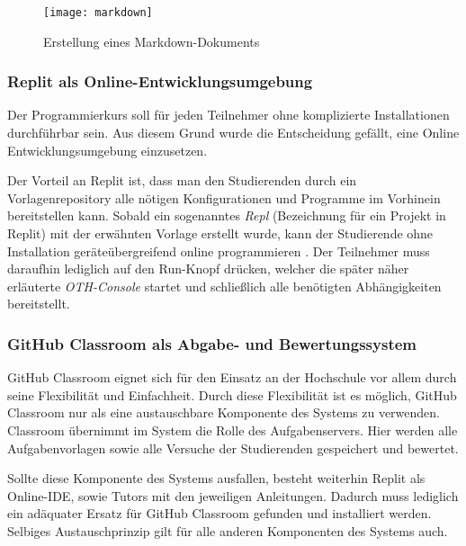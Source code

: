 \begin{figure}[H]
    \centering
    \texttt{[image: markdown]}
    \caption{Erstellung eines Markdown-Dokuments}
    \label{fig:markdown}
\end{figure}

\subsubsection{Replit als Online-Entwicklungsumgebung}
Der Programmierkurs soll für jeden Teilnehmer ohne komplizierte Installationen
durchführbar sein. Aus diesem Grund wurde die Entscheidung gefällt, eine
Online Entwicklungsumgebung einzusetzen.

Der Vorteil an Replit ist, dass man den Studierenden durch ein
Vorlagenrepository alle nötigen Konfigurationen und Programme im Vorhinein
bereitstellen kann. Sobald ein sogenanntes \emph{Repl} (Bezeichnung für
ein Projekt in Replit) mit der erwähnten Vorlage erstellt wurde, kann der
Studierende ohne Installation geräteübergreifend online programmieren
\parencite{replit-import-from-github}. Der Teilnehmer muss daraufhin lediglich
auf den \glqq Run\grqq{}-Knopf drücken, welcher die später näher erläuterte
\emph{OTH-Console} startet und schließlich alle benötigten Abhängigkeiten
bereitstellt.

\subsubsection{GitHub Classroom als Abgabe- und Bewertungssystem}
GitHub Classroom eignet sich für den Einsatz an der Hochschule vor allem durch
seine Flexibilität und Einfachheit. Durch diese Flexibilität ist es möglich,
GitHub Classroom nur als eine austauschbare Komponente des Systems zu verwenden.
Classroom übernimmt im System die Rolle des Aufgabenservers. Hier werden alle
Aufgabenvorlagen sowie alle Versuche der Studierenden gespeichert und bewertet.

Sollte diese Komponente des Systems ausfallen, besteht weiterhin Replit als
Online-IDE, sowie Tutors mit den jeweiligen Anleitungen. Dadurch muss lediglich
ein adäquater Ersatz für GitHub Classroom gefunden und installiert werden.
Selbiges Austauschprinzip gilt für alle anderen Komponenten des Systems auch.